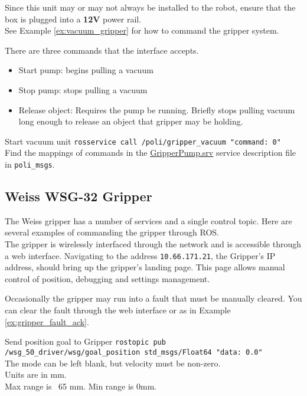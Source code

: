 Since this unit may or may not always be installed to the robot, ensure that the box is plugged into a \textbf{12V} power rail. \\
See Example \ref{ex:vacuum_gripper} for how to command the gripper system.

There are three commands that the interface accepts. 
\begin{itemize}
\item Start pump: begins pulling a vacuum
\item Stop pump: stops pulling a vacuum
\item Release object: Requires the pump be running. Briefly stops pulling vacuum long enough to release an object that gripper may be holding.
\end{itemize}

\begin{example}{Start vacuum unit}
  \label{ex:vacuum_gripper}
    \texttt{rosservice call /poli/gripper\_vacuum "command: 0"} \\
    Find the mappings of commands in the \href{https://github.com/si-machines/poli2/blob/master/poli_msgs/srv/GripperPump.srv}{GripperPump.srv} service description file in \texttt{poli\_msgs}.
\end{example}



\subsection{Weiss WSG-32 Gripper}
The Weiss gripper has a number of services and a single control topic.
Here are several examples of commanding the gripper through ROS. \\

The gripper is wirelessly interfaced through the network and is accessible through a web interface. 
Navigating to the address \texttt{10.66.171.21}, the Gripper's IP address, should bring up the gripper's landing page. 
This page allows manual control of position, debugging and settings management.

Occasionally the gripper may run into a fault that must be manually cleared. 
You can clear the fault through the web interface or as in Example \ref{ex:gripper_fault_ack}.

\begin{example}{Send position goal to Gripper}
  \label{ex:gripper_pos_goal}
    \texttt{rostopic pub /wsg\_50\_driver/wsg/goal\_position std\_msgs/Float64 "data: 0.0"} \\
    
    The mode can be left blank, but velocity must be non-zero. \\
    Units are in mm. \\
    Max range is ~65 mm. Min range is 0mm.
\end{example}

